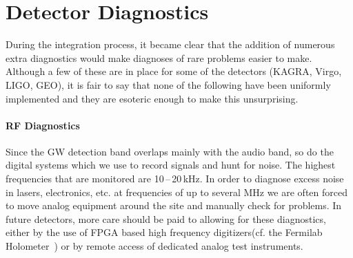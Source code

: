 %


\section{Detector Diagnostics}
\label{s:IDC:diagnostics}
During the integration process, it became clear that the addition of numerous
extra diagnostics would make diagnoses of rare problems easier to make. Although
a few of these are in place for some of the detectors (KAGRA, Virgo, LIGO, GEO),
it is fair to say that none of the following have been uniformly implemented and
they are esoteric enough to make this unsurprising.

\paragraph{RF Diagnostics}
Since the GW detection band overlaps mainly with the audio band, so do
the digital systems which we use to record signals and hunt for
noise. The highest frequencies that are monitored are
10\,--\,20\,kHz. In order to diagnose excess noise in lasers,
electronics, etc. at frequencies of up to several MHz we are often
forced to move analog equipment around the site and manually check for
problems. In future detectors, more care should be paid to allowing
for these diagnostics, either by the use of FPGA based high frequency digitizers(cf. the Fermilab Holometer~\cite{Chou:2017em}) or by remote access of dedicated analog test instruments.

